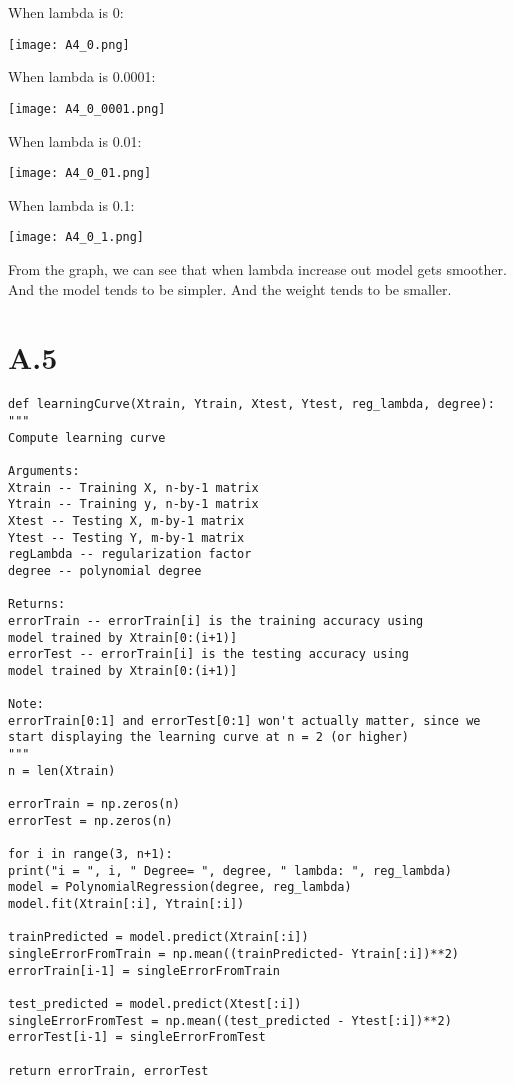 \documentclass{article}
\begin{document}
When lambda is 0:

\texttt{[image: A4\_0.png]}

When lambda is 0.0001:

\texttt{[image: A4\_0\_0001.png]}

When lambda is 0.01:

\texttt{[image: A4\_0\_01.png]}

When lambda is 0.1:

\texttt{[image: A4\_0\_1.png]}

From the graph, we can see that when lambda increase out model gets smoother. And the model tends to be simpler. And the weight tends to be smaller.

\section*{A.5}

\begin{verbatim}
def learningCurve(Xtrain, Ytrain, Xtest, Ytest, reg_lambda, degree):
"""
Compute learning curve

Arguments:
Xtrain -- Training X, n-by-1 matrix
Ytrain -- Training y, n-by-1 matrix
Xtest -- Testing X, m-by-1 matrix
Ytest -- Testing Y, m-by-1 matrix
regLambda -- regularization factor
degree -- polynomial degree

Returns:
errorTrain -- errorTrain[i] is the training accuracy using
model trained by Xtrain[0:(i+1)]
errorTest -- errorTrain[i] is the testing accuracy using
model trained by Xtrain[0:(i+1)]

Note:
errorTrain[0:1] and errorTest[0:1] won't actually matter, since we start displaying the learning curve at n = 2 (or higher)
"""
n = len(Xtrain)

errorTrain = np.zeros(n)
errorTest = np.zeros(n)

for i in range(3, n+1):
print("i = ", i, " Degree= ", degree, " lambda: ", reg_lambda)
model = PolynomialRegression(degree, reg_lambda)
model.fit(Xtrain[:i], Ytrain[:i])

trainPredicted = model.predict(Xtrain[:i])
singleErrorFromTrain = np.mean((trainPredicted- Ytrain[:i])**2)
errorTrain[i-1] = singleErrorFromTrain

test_predicted = model.predict(Xtest[:i])
singleErrorFromTest = np.mean((test_predicted - Ytest[:i])**2)
errorTest[i-1] = singleErrorFromTest

return errorTrain, errorTest
\end{verbatim}
\end{document}
